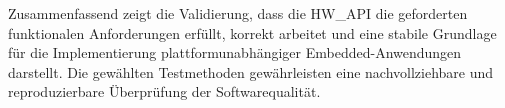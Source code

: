 %
%

Zusammenfassend zeigt die Validierung, dass die HW\_API die geforderten funktionalen Anforderungen erfüllt, korrekt arbeitet und eine stabile Grundlage für die Implementierung plattformunabhängiger Embedded-Anwendungen darstellt. 
Die gewählten Testmethoden gewährleisten eine nachvollziehbare und reproduzierbare Überprüfung der Softwarequalität.











































